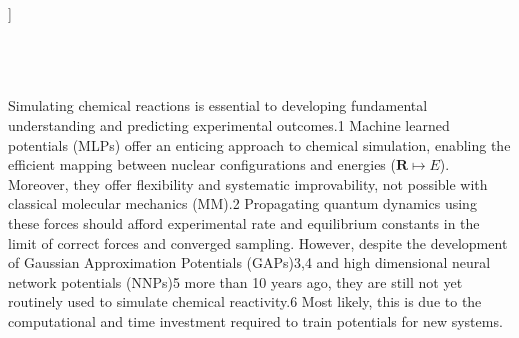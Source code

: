\documentclass[twoside,twocolumn,9pt]{article}
\begin{document}
  ]

\renewcommand*\rmdefault{bch}\normalfont\upshape
\rmfamily
\section*{}
\vspace{-1cm}








\\%


\rmfamily %




Simulating chemical reactions is essential to developing fundamental understanding and predicting experimental outcomes.1 Machine learned potentials (MLPs) offer an enticing approach to chemical simulation, enabling the efficient mapping between nuclear configurations and energies ($\boldsymbol{R} \mapsto E$). Moreover, they offer flexibility and systematic improvability, not possible with classical molecular mechanics (MM).2 Propagating quantum dynamics using these forces should afford experimental rate and equilibrium constants in the limit of correct forces and converged sampling. However, despite the development of Gaussian Approximation Potentials (GAPs)3,4 and high dimensional neural network potentials (NNPs)5 more than 10 years ago, they are still not yet routinely used to simulate chemical reactivity.6 Most likely, this is due to the computational and time investment required to train potentials for new systems. 
\end{document}
